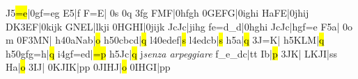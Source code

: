 \def\sfql#1{\usf{#1}\ql{#1}}%
\barre\Arpg J5\notes\soufflcr{}\hl{=e}|\qsoqb0gf{=e}g\enotes
\temps\arpg E5\notes{}\sfql a\sk|\zq f\sfql m\enotes
\temps\notes{}F{=E}|\relax
  \ifx\mxversion\undefined\Ilegu0s\relax
  \else\Ilegu0q\relax
  \fi
  \dsoqb3fg\enotes
\barre\notes\zq F\ql M\sk{}F|\qsoqb0hfgh\enotes
\temps\notes\qsoqb0GEFG|\qsoqb0ighi\enotes
\Alaligne\noteskipLARGE\notes\zq H\ql a\sk{}FE|\qsoqb0jhij\enotes
\temps\notes\zq D\ql K\sk\dsoqb3EF|\qsoqb0kijk\enotes
\barre\notes\zq G\ql N\sk\zq E\ql L|lkji\enotes
\temps\notes\qsoqb0HGHI|\qsoqb0jijk\enotes
\barre\notes\zq J\ql c\sk\zq J\ql c|jihg\enotes
\temps\notes{}fe{=d}{_d}|\qsoqb0hghi\enotes
\Alaligne\notes\zq J\ql c\sk\zq J\ql c|hgf{=e}\enotes
\temps\arpg F5\notes{}\ql a\sk|\relax
  \ifx\mxversion\undefined{}\relax
  \else\tslur0o\relax
  \fi
  \ql m\enotes
\temps\notes\Ilegl0F\dqb3MN|\soupir\enotes
\barre\nspace\uarpg h4\notes{}\qqb0aNab|\hl o\enotes
\temps\uArpg h5\notes\qqb0cbcd|\hl q\enotes
\barre\nspace\uarpg l4\notes\qqb0edef|\hl s\enotes
\temps\uarpg l4\notes{}edcb|\hl s\enotes
\barre\nspace\uarpg h5\notes{}\ql a\sk|\hl q\enotes
\def\atnextline{\advancebottom{-\Interligne}\relax\def\interfacteur{10}}%
\Zalapage\noteskipLarge\notes\dsoqb3J{=K}|\enotes
\temps\uArpg h5\notes{}KLM|\hl q\enotes
\barre\noteskipLarge\nspace\uArpg h5\notes\qboqb0gfg{=h}|\hl q\enotes
\temps\uArpg i4\notes{}gf{=e}d|\hl{=p}\enotes
\barre\nspace\uArpg h5\notes\zq J\ql c\sk{}|\hl q\enotes
\temps\notes\zcharnote j{\noteskip\it senza arpeggiare}\relax
{}f{_e}{_d}c|\ql t\sk{}\ql t\enotes
\barre\notes{}\zq I\ql b\sk|\hl p\enotes
\temps\notes\dsoqb3JK|\enotes
\temps\notes\Soufflcr{}LKJI|\ql s\sk{}\ql s\enotes
\Alaligne\notes\zq H\ql a\sk|\hl o\enotes
\temps\notes\dsoqb3IJ|\enotes
\temps\notes\qsoqb0KJIK|\ql p\sk{}\ql p\enotes
\barre\notes\qsoqb0JIHJ|\hl o\enotes
\temps\notes\qsoqb0IHGI|\ql p\sk{}\ql p\sk\enotes

